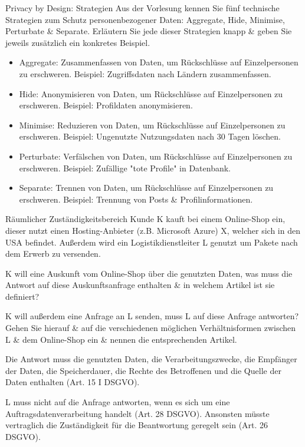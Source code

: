 \documentclass{exercisesheet}
\begin{document}
\begin{exercise}{Privacy by Design: Strategien}
  Aus der Vorlesung kennen Sie fünf technische Strategien zum Schutz personenbezogener Daten: Aggregate, Hide, Minimise, Perturbate \& Separate.
  Erläutern Sie jede dieser Strategien knapp \& geben Sie jeweils zusätzlich ein konkretes Beispiel.
\end{exercise}

\begin{solution}
  \begin{itemize}
    \item Aggregate: Zusammenfassen von Daten, um Rückschlüsse auf Einzelpersonen zu erschweren. Beispiel: Zugriffsdaten nach Ländern zusammenfassen.
    \item Hide: Anonymisieren von Daten, um Rückschlüsse auf Einzelpersonen zu erschweren. Beispiel: Profildaten anonymisieren.
    \item Minimise: Reduzieren von Daten, um Rückschlüsse auf Einzelpersonen zu erschweren. Beispiel: Ungenutzte Nutzungsdaten nach 30 Tagen löschen.
    \item Perturbate: Verfälschen von Daten, um Rückschlüsse auf Einzelpersonen zu erschweren. Beispiel: Zufällige "tote Profile" in Datenbank.
    \item Separate: Trennen von Daten, um Rückschlüsse auf Einzelpersonen zu erschweren. Beispiel: Trennung von Posts \& Profilinformationen.
  \end{itemize}
\end{solution}

\begin{eexercises}{Räumlicher Zuständigkeitsbereich}{
    Kunde K kauft bei einem Online-Shop ein, dieser nutzt einen Hosting-Anbieter (z.B. Microsoft Azure) X, welcher sich in den USA befindet. Außerdem wird ein Logistikdienstleiter L genutzt um Pakete nach dem Erwerb zu versenden.
  }
  \item K will eine Auskunft vom Online-Shop über die genutzten Daten, was muss die Antwort auf diese Auskunftsanfrage enthalten \& in welchem Artikel ist sie definiert?
  \item K will außerdem eine Anfrage an L senden, muss L auf diese Anfrage antworten? Gehen Sie hierauf \& auf die verschiedenen möglichen Verhältnisformen zwischen L \& dem Online-Shop ein \& nennen die entsprechenden Artikel.
\end{eexercises}

\begin{solutions}
  \item Die Antwort muss die genutzten Daten, die Verarbeitungszwecke, die Empfänger der Daten, die Speicherdauer, die Rechte des Betroffenen und die Quelle der Daten enthalten (Art. 15 I DSGVO).
  \item L muss nicht auf die Anfrage antworten, wenn es sich um eine Auftragsdatenverarbeitung handelt (Art. 28 DSGVO). Ansonsten müsste vertraglich die Zuständigkeit für die Beantwortung geregelt sein (Art. 26 DSGVO).
\end{solutions}
\end{document}
